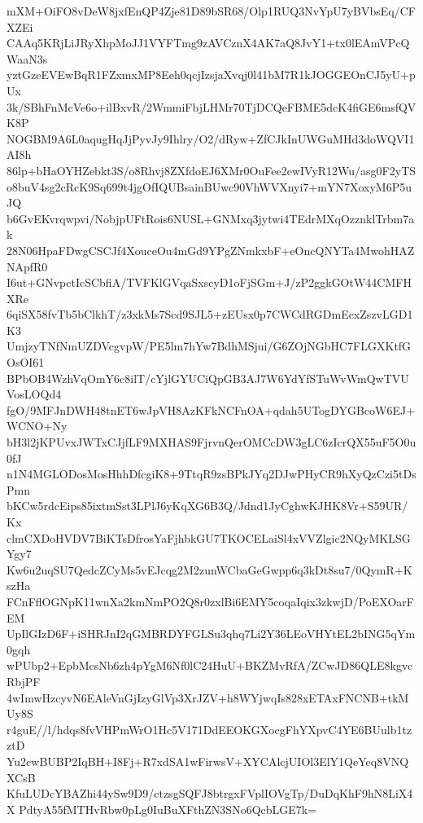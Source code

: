 mXM+OiFO8vDeW8jxfEnQP4Zje81D89bSR68/Olp1RUQ3NvYpU7yBVbsEq/CFXZEi
CAAq5KRjLiJRyXhpMoJJ1VYFTmg9zAVCznX4AK7aQ8JvY1+tx0lEAmVPcQWaaN3s
yztGzeEVEwBqR1FZxmxMP8Eeh0qcjIzsjaXvqj0l41bM7R1kJOGGEOnCJ5yU+pUx
3k/SBhFnMcVe6o+ilBxvR/2WmmiFbjLHMr70TjDCQeFBME5dcK4fiGE6msfQVK8P
NOGBM9A6L0aqugHqJjPyvJy9Ihlry/O2/dRyw+ZfCJkInUWGuMHd3doWQVI1AI8h
86lp+bHaOYHZebkt3S/o8Rhvj8ZXfdoEJ6XMr0OuFee2ewIVyR12Wu/asg0F2yTS
o8buV4sg2cRcK9Sq699t4jgOfIQUBsainBUwc90VhWVXnyi7+mYN7XoxyM6P5uJQ
b6GvEKvrqwpvi/NobjpUFtRois6NUSL+GNMxq3jytwi4TEdrMXqOzznklTrbm7ak
28N06HpaFDwgCSCJf4XouceOu4mGd9YPgZNmkxbF+eOncQNYTa4MwohHAZNApfR0
I6ut+GNvpctIcSCbfiA/TVFKlGVqaSxscyD1oFjSGm+J/zP2ggkGOtW44CMFHXRe
6qiSX58fvTb5bClkhT/z3xkMs7Scd9SJL5+zEUsx0p7CWCdRGDmEcxZszvLGD1K3
UmjzyTNfNmUZDVcgvpW/PE5lm7hYw7BdhMSjui/G6ZOjNGbHC7FLGXKtfGOsOI61
BPbOB4WzhVqOmY6c8ilT/cYjlGYUCiQpGB3AJ7W6YdYfSTuWvWmQwTVUVosLOQd4
fgO/9MFJnDWH48tnET6wJpVH8AzKFkNCFnOA+qdah5UTogDYGBcoW6EJ+WCNO+Ny
bH3l2jKPUvxJWTxCJjfLF9MXHAS9FjrvnQerOMCcDW3gLC6zIcrQX55uF5O0u0fJ
n1N4MGLODosMosHhhDfcgiK8+9TtqR9zsBPkJYq2DJwPHyCR9hXyQzCzi5tDsPmn
bKCw5rdcEips85ixtmSst3LPlJ6yKqXG6B3Q/Jdnd1JyCghwKJHK8Vr+S59UR/Kx
clmCXDoHVDV7BiKTsDfrosYaFjhbkGU7TKOCELaiSl4xVVZlgic2NQyMKLSGYgy7
Kw6u2uqSU7QedcZCyMs5vEJcqg2M2zunWCbaGeGwpp6q3kDt8su7/0QymR+KszHa
FCnFflOGNpK11wnXa2kmNmPO2Q8r0zxlBi6EMY5coqaIqix3zkwjD/PoEXOarFEM
UpIlGIzD6F+iSHRJnI2qGMBRDYFGLSu3qhq7Li2Y36LEoVHYtEL2bING5qYm0gqh
wPUbp2+EpbMcsNb6zh4pYgM6Nf0lC24HuU+BKZMvRfA/ZCwJD86QLE8kgvcRbjPF
4wImwHzcyvN6EAleVnGjIzyGlVp3XrJZV+h8WYjwqIs828xETAxFNCNB+tkMUy8S
r4guE//l/hdqs8fvVHPmWrO1Hc5V171DdEEOKGXocgFhYXpvC4YE6BUulb1tzztD
Yu2cwBUBP2IqBH+I8Fj+R7xdSA1wFirwsV+XYCAlcjUIOl3ElY1QeYeq8VNQXCsB
KfuLUDcYBAZhi44ySw9D9/ctzsgSQFJ8btrgxFVplIOVgTp/DuDqKhF9hN8LiX4X
PdtyA55fMTHvRbw0pLg0IuBuXFthZN3SNo6QcbLGE7k=

